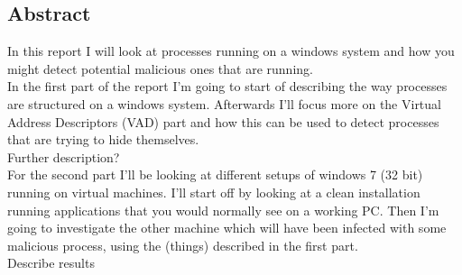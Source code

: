 \documentclass[a4paper]{article}
\author{Kristian Hougaard Olsen \inst{1}}
\begin{document}
\subsection*{Abstract}
%
In this report I will look at processes running on a windows system and how you might detect potential malicious ones that are running. \\
%
In the first part of the report I’m going to start of describing the way processes are structured on a windows system. Afterwards I’ll focus more on the Virtual Address Descriptors (VAD) part and how this can be used to detect processes that are trying to hide themselves. \\
%
Further description? \\
%
For the second part I’ll be looking at different setups of windows 7 (32 bit) running on virtual machines. I’ll start off by looking at a clean installation running applications that you would normally see on a working PC. Then I’m going to investigate the other machine which will have been infected with some malicious process, using the (things) described in the first part. \\
%
Describe results \\



\newpage
\end{document}
